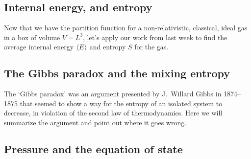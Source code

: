 \subsection{Internal energy, and entropy}
Now that we have the partition function for a non-relativistic, classical, ideal gas in a box of volume $V = L^3$, let's apply our work from last week to find the average internal energy $\left\langle E \right\rangle$ and entropy $S$ for the gas.





\newpage %
\subsection{The Gibbs paradox and the mixing entropy}
The `Gibbs paradox' was an argument presented by J.\ Willard Gibbs in 1874--1875 that seemed to show a way for the entropy of an isolated system to decrease, in violation of the second law of thermodynamics.
Here we will summarize the argument and point out where it goes wrong.




\newpage %
\subsection{Pressure and the equation of state}
